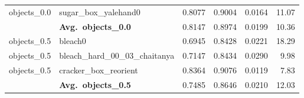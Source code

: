 \begin{longtable}{llrrrr}
  objects_0.0 & sugar\_box\_yalehand0 & 0.8077 & 0.9004 & 0.0164 & 11.07 \\
  \cmidrule{2-6}
  & \textbf{Avg.~objects_0.0} & 0.8147 & 0.8974 & 0.0199 & 10.36 \\
  \midrule
  objects_0.5 & bleach0 & 0.6945 & 0.8428 & 0.0221 & 18.29 \\
  objects_0.5 & bleach\_hard\_00\_03\_chaitanya & 0.7147 & 0.8434 & 0.0290 & 9.98 \\
  objects_0.5 & cracker\_box\_reorient & 0.8364 & 0.9076 & 0.0119 & 7.83 \\
  \cmidrule{2-6}
  & \textbf{Avg.~objects_0.5} & 0.7485 & 0.8646 & 0.0210 & 12.03 \\
  \midrule
\bottomrule
\end{longtable}